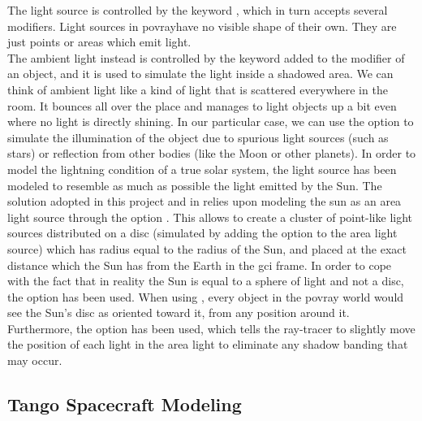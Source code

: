 The light source is controlled by the keyword , which in turn accepts several modifiers. Light sources in \acrshort{povray}have no visible shape of their own. They are just points or areas which emit light.\\
The ambient light instead is controlled by the keyword  added to the  modifier of an object, and it is used to simulate the light inside a shadowed area.
We can think of ambient light like a kind of light that is scattered everywhere in the room. It bounces all over the place and manages to light objects up a bit even where no light is directly shining.
In our particular case, we can use the  option to simulate the illumination of the object due to spurious light sources (such as stars) or reflection from other bodies (like the Moon or other planets).
In order to model the lightning condition of a true solar system, the light source has been modeled to resemble as much as possible the light emitted by the Sun.
The solution adopted in this project and in \cite{jacopo} relies upon modeling the sun as an area light source through the option . This allows to create a cluster of point-like light sources distributed on a disc (simulated by adding the  option to the area light source) which has radius equal to the radius of the Sun, and placed at the exact distance which the Sun has from the Earth in the \acrshort{gci} frame. In order to cope with the fact that in reality the Sun is equal to a sphere of light and not a disc, the option  has been used. When using , every object in the \acrshort{povray} world would see the Sun's disc as oriented toward it, from any position around it.
Furthermore, the option  has been used, which tells the ray-tracer to slightly move the position of each light in the area light to eliminate any shadow banding that may occur.

\subsection{Tango Spacecraft Modeling}

